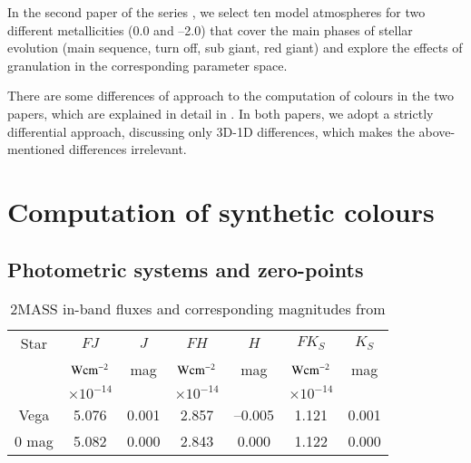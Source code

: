 \documentclass[]{aa}
\begin{document}
In the second paper of the series \citep{paper2}, 
we select ten model atmospheres
for two different metallicities (0.0 and --2.0) that cover the main phases
of stellar evolution (main sequence, turn off, sub giant, red giant) and explore
the effects of granulation in the corresponding parameter space.

There are  some differences of approach to the computation of colours in the
two papers, which are explained in detail in \citet{paper2}.  
In both papers, we adopt a strictly differential approach, discussing only 
3D-1D differences, which makes the above-mentioned differences irrelevant.




\section{Computation of synthetic colours}

\subsection{Photometric systems and zero-points}

\begin{table}
\centering
\caption{2MASS in-band fluxes and corresponding magnitudes from \citet{Cohen}\label{2mass}}
\renewcommand{\tabcolsep}{3pt}
\begin{tabular}{ccccccc}
\hline
Star   & $FJ$ & $J$     & $FH$  & $H$  &   $FK_S$ & $K_S$  \\
       & $\rm Wcm^{-2}$  & mag & $\rm Wcm^{-2}$ & mag &$\rm Wcm^{-2}$ & mag \\
       &$\times 10^{-14}$& &$\times 10^{-14}$& &$\times 10^{-14}$& \\  
\hline\hline
Vega   & \phantom{1}5.076 & \phantom{--}0.001& \phantom{1}2.857 & --0.005 & 1.121 & \phantom{--}0.001 \\
0 mag  & \phantom{1}5.082 & \phantom{--}0.000 & \phantom{1}2.843 & \phantom{--}0.000 & 1.122 & \phantom{--}0.000 \\
\hline\hline
\end{tabular}
\end{table}
\end{document}
